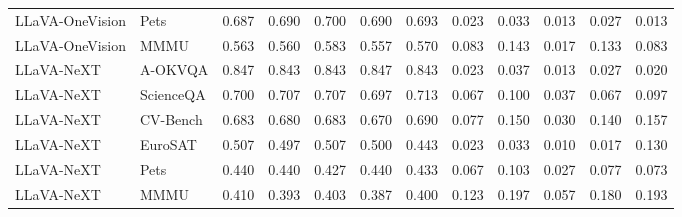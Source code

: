 \begin{tabular}{llrrrrr rrrrr}
LLaVA-OneVision & Pets & 0.687 & 0.690 & 0.700 & 0.690 & 0.693 & 0.023 & 0.033 & 0.013 & 0.027 & 0.013 \\
LLaVA-OneVision & MMMU & 0.563 & 0.560 & 0.583 & 0.557 & 0.570 & 0.083 & 0.143 & 0.017 & 0.133 & 0.083 \\
LLaVA-NeXT & A-OKVQA & 0.847 & 0.843 & 0.843 & 0.847 & 0.843 & 0.023 & 0.037 & 0.013 & 0.027 & 0.020 \\
LLaVA-NeXT & ScienceQA & 0.700 & 0.707 & 0.707 & 0.697 & 0.713 & 0.067 & 0.100 & 0.037 & 0.067 & 0.097 \\
LLaVA-NeXT & CV-Bench & 0.683 & 0.680 & 0.683 & 0.670 & 0.690 & 0.077 & 0.150 & 0.030 & 0.140 & 0.157 \\
LLaVA-NeXT & EuroSAT & 0.507 & 0.497 & 0.507 & 0.500 & 0.443 & 0.023 & 0.033 & 0.010 & 0.017 & 0.130 \\
LLaVA-NeXT & Pets & 0.440 & 0.440 & 0.427 & 0.440 & 0.433 & 0.067 & 0.103 & 0.027 & 0.077 & 0.073 \\
LLaVA-NeXT & MMMU & 0.410 & 0.393 & 0.403 & 0.387 & 0.400 & 0.123 & 0.197 & 0.057 & 0.180 & 0.193 \\
\bottomrule
\end{tabular}
